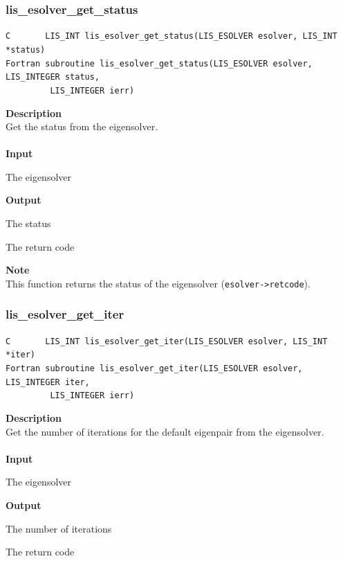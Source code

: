 \documentclass[a4paper]{article}
\newcommand{\namelistlabel}[1]{\mbox{#1}\hfill}
\newenvironment{namelist}[1]{%
\begin{list}{}
  {\let\makelabel\namelistlabel
  \settowidth{\labelwidth}{#1}
  \setlength{\leftmargin}{1.1\labelwidth}}
  }{%
\end{list}}
\begin{document}
\newpage
\subsubsection{lis\_esolver\_get\_status}
\begin{screen}
\verb|C       LIS_INT lis_esolver_get_status(LIS_ESOLVER esolver, LIS_INT *status)|\\
\verb|Fortran subroutine lis_esolver_get_status(LIS_ESOLVER esolver, LIS_INTEGER status,|\\
\verb|         LIS_INTEGER ierr)|
\end{screen}
{\bf Description}\\
\indent
Get the status from the eigensolver.
\\ \\
\noindent
{\bf Input}
\begin{namelist}{XXXXXXXXXXXXXXXXXXXX}
\item[\tt esolver] The eigensolver
\end{namelist}
{\bf Output}
\begin{namelist}{XXXXXXXXXXXXXXXXXXXX}
\item[\tt status] The status
\item[\tt ierr] The return code
\end{namelist}
{\bf Note}\\
\indent
This function returns the status of the eigensolver ({\tt esolver->retcode}).

\subsubsection{lis\_esolver\_get\_iter}
\begin{screen}
\verb|C       LIS_INT lis_esolver_get_iter(LIS_ESOLVER esolver, LIS_INT *iter)|\\
\verb|Fortran subroutine lis_esolver_get_iter(LIS_ESOLVER esolver, LIS_INTEGER iter,|\\
\verb|         LIS_INTEGER ierr)|
\end{screen}
{\bf Description}\\
\indent
Get the number of iterations for the default eigenpair from the eigensolver.
\\ \\
\noindent
{\bf Input}
\begin{namelist}{XXXXXXXXXXXXXXXXXXXX}
\item[\tt esolver] The eigensolver
\end{namelist}
{\bf Output}
\begin{namelist}{XXXXXXXXXXXXXXXXXXXX}
\item[\tt iter] The number of iterations
\item[\tt ierr] The return code
\end{namelist}
\end{document}
